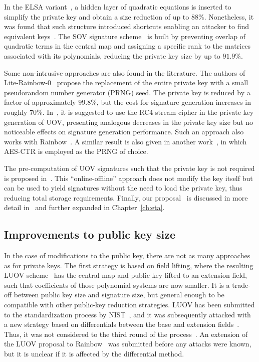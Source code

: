 \documentclass[12pt, a4paper, oneside]{memoir}
\theoremstyle{definition}
\begin{document}
In the ELSA variant~\cite{Shim:201712}, a hidden layer of quadratic equations is inserted to simplify the private key and obtain a size reduction of up to $88\%$. Nonetheless, it was found that such structure introduced shortcuts enabling an attacker to find equivalent keys~\cite{Hashimoto:201909}. The SOV signature scheme~\cite{Shim:202001} is built by preventing overlap of quadratic terms in the central map and assigning a specific rank to the matrices associated with its polynomials, reducing the private key size by up to $91.9\%$.

Some non-intrusive approaches are also found in the literature. The authors of Lite-Rainbow-0~\cite{Shim:201512} propose the replacement of the entire private key with a small pseudorandom number generator (PRNG) seed. The private key is reduced by a factor of approximately $99.8\%$, but the cost for signature generation increases in roughly $70\%$. In~\cite{Borges:201209}, it is suggested to use the RC4 stream cipher in the private key generation of UOV, presenting analogous decreases in the private key size but no noticeable effects on signature generation performance. Such an approach also works with Rainbow~\cite{Dornelles:201910}. A similar result is also given in another work~\cite{Seo:201403}, in which AES-CTR is employed as the PRNG of choice.

The pre-computation of UOV signatures such that the private key is not required is proposed in~\cite{Chen:201603}. This ``online-offline'' approach does not modify the key itself but can be used to yield signatures without the need to load the private key, thus reducing total storage requirements. Finally, our proposal~\cite{Zambonin:201907} is discussed in more detail in~\cite{Bittencourt:201911} and further expanded in Chapter~\ref{ch:eta}.

\subsection{Improvements to public key size}\label{subsec:pub}

In the case of modifications to the public key, there are not as many approaches as for private keys. The first strategy is based on field lifting, where the resulting LUOV scheme~\cite{Beullens:201712} has the central map and public key lifted to an extension field, such that coefficients of those polynomial systems are now smaller. It is a trade-off between public key size and signature size, but general enough to be compatible with other public-key reduction strategies. LUOV has been submitted to the standardization process by NIST~\cite{Alagic:201901}, and it was subsequently attacked with a new strategy based on differentials between the base and extension fields~\cite{Ding:202008}. Thus, it was not considered to the third round of the process~\cite[Sec.~3.24]{Alagic:202007}. An extension of the LUOV proposal to Rainbow~\cite{Duong:202003} was submitted before any attacks were known, but it is unclear if it is affected by the differential method.
\end{document}
